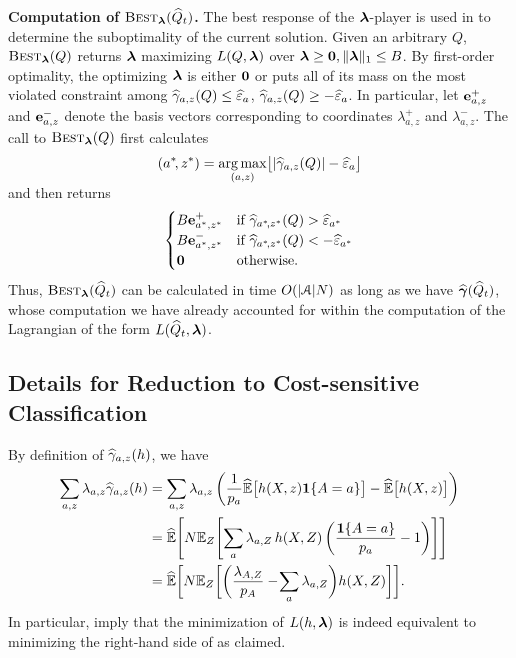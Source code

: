 \textbf{Computation of $\textsc{\mdseries Best}_{\boldsymbol{\lambda}}(\widehat{Q}_t)$.} The best response of the $\boldsymbol{\lambda}$-player is used in  to determine the suboptimality of the current solution. Given an arbitrary $Q$, $\textsc{\mdseries Best}_{\boldsymbol{\lambda}}(Q)$ returns
$\boldsymbol{\lambda}$ maximizing $L(Q,\boldsymbol{\lambda})$ over $\boldsymbol{\lambda}\ge\mathbf{0},\lVert\boldsymbol{\lambda}\rVert_1\le B$. By first-order optimality, the optimizing $\boldsymbol{\lambda}$ is either $\mathbf{0}$ or puts all of its mass on the most
violated constraint among $\widehat{\gamma}_{a,z}(Q)\le\widehat{\varepsilon}_{a}$, $\widehat{\gamma}_{a,z}(Q)\ge-\widehat{\varepsilon}_{a}$. In particular,
let $\mathbf{e}_{a,z}^+$ and $\mathbf{e}_{a,z}^-$ denote the basis vectors corresponding to coordinates $\lambda_{a,z}^+$ and $\lambda_{a,z}^-$. The call to $\textsc{\mdseries Best}_{\boldsymbol{\lambda}}(Q)$ first calculates
\[
  (a^*\!,z^*)=\smash{\operatorname*{arg\,max}_{(a,z)}\bigl[\left\lvert\widehat{\gamma}_{a,z}(Q)\right\rvert-\widehat{\varepsilon}_{a}\bigr]}
\]
and then returns
\[
   \begin{cases}
   B\mathbf{e}_{a^*,z^*}^+
      &\text{if $\widehat{\gamma}_{a^*\!,z^*}(Q)>\widehat{\varepsilon}_{a^*}$}
   \\
   B\mathbf{e}_{a^*,z^*}^-
      &\text{if $\widehat{\gamma}_{a^*\!,z^*}(Q)<-\widehat{\varepsilon}_{a^*}$}
   \\
   \mathbf{0}
      &\text{otherwise.}
   \end{cases}
\]
Thus, $\textsc{\mdseries Best}_{\boldsymbol{\lambda}}(\widehat{Q}_t)$ can be calculated in time $O(\lvert\mathcal{A}\rvert N)$ as long as we have $\widehat{\boldsymbol{\gamma}}(\widehat{Q}_t)$, whose computation we have already accounted for within the computation of the Lagrangian of the form $L(\widehat{Q}_t,\boldsymbol{\lambda})$.

\subsection{Details for Reduction to Cost-sensitive Classification}

By definition of $\widehat{\gamma}_{a,z}(h)$, we have
\begin{align}
\notag
\sum_{a,z}\lambda_{a,z}\widehat{\gamma}_{a,z}(h)
&=
  \sum_{a,z}\lambda_{a,z}\left(\frac{1}{p_{a}}\widehat{\mathbb{E}}\bigl[h(X,z)\mathbf{1}\{A=a\}\bigr]
  - \widehat{\mathbb{E}}\bigl[h(X,z)\bigr]\right)
\\
\notag
&=
  \widehat{\mathbb{E}}\Biggl[
  N\mathbb{E}_Z\Biggl[
     \sum_{a}\lambda_{a,Z}\,h(X,Z)\left(\frac{\mathbf{1}\{A=a\}}{p_{a}} - 1\right)
  \Biggr]\Biggr]
\\
\label{eq:hgamma:1}
&=
  \widehat{\mathbb{E}}\biggl[
  N\mathbb{E}_Z\biggl[
     \biggl(
     \frac{\lambda_{A,Z}}{p_A} -\!\sum_a\lambda_{a,Z}
     \biggr)
     h(X,Z)
  \biggr]\biggr].
\end{align}
%
In particular,  imply that the minimization of $L(h,\boldsymbol{\lambda})$ is indeed equivalent to minimizing the right-hand side of  as claimed.

